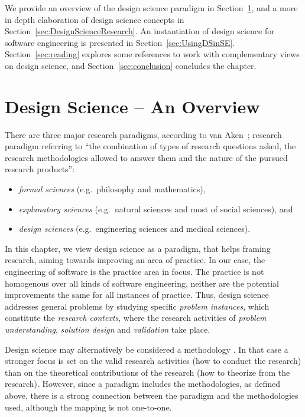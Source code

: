 \documentclass[graybox]{svmult}
\begin{document}
We provide an overview of the design science paradigm in Section~\ref{sec:overview}, and a more in depth elaboration of design science concepts in Section~\ref{sec:DesignScienceResearch}. An instantiation of design science for software engineering is presented in Section~\ref{sec:UsingDSinSE}. Section~\ref{sec:reading} explores some references to work with complementary views on design science, and Section~\ref{sec:conclusion} concludes the chapter.


\section{Design Science -- An Overview}
\label{sec:overview}


There are three major research paradigms, according to van Aken~\cite{van_aken_management_2004}; research paradigm referring to ``the combination of types of research questions asked, the research methodologies allowed to answer them and the nature of the pursued research products'':
\begin{itemize}
\item \emph{formal sciences} (e.g.\ philosophy and mathematics), 
\item \emph{explanatory sciences} (e.g.\ natural sciences and most of social sciences), and 
\item \emph{design sciences} (e.g.\ engineering sciences and medical sciences).  
\end{itemize}

In this chapter, we view design science as a paradigm, that helps framing research, aiming towards improving an area of practice. In our case, the engineering of software is the practice area in focus. The practice is not homogenous over all kinds of software engineering, neither are the potential improvements the same for all instances of practice. Thus, design science addresses general problems by studying  specific \emph{problem instances}, which constitute the \emph{research contexts}, where the research activities of \emph{problem understanding}, \emph{solution design} and \emph{validation} take place.

Design science may alternatively be considered a methodology \cite{Wohlin2015}. In that case a stronger focus is set on the valid research activities (how to conduct the research) than on the theoretical contributions of the research (how to theorize from the research). However, since a paradigm includes the methodologies, as defined above, there is a strong connection between the paradigm and the methodologies used, although the mapping is not one-to-one.
\end{document}

